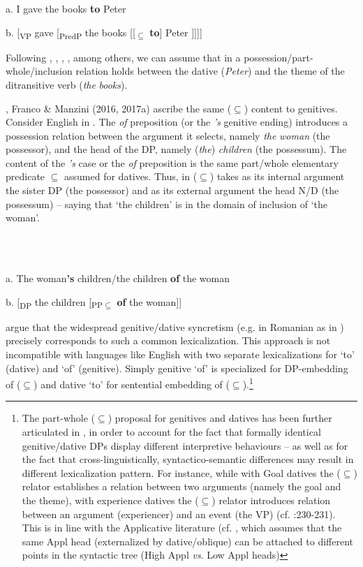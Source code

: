 \documentclass[output=paper]{langsci/langscibook}
\begin{document}
           a.  I gave the books \textbf{to} Peter

b.   [\textsubscript{VP} gave [\textsubscript{PredP} the books [[\textsubscript{${\subseteq}$} \textbf{to}] Peter ]]]]

Following \citet{Kayne1984}, \citet{Pesetsky1995}, \citet{BeckJohnson2004}, \citet{Harley2002}, among others, we can assume that in  a possession/part-whole/inclusion relation holds between the dative (\textit{Peter}) and the theme of the ditransitive verb (\textit{the} \textit{books}). 

\citet{ManziniSavoia2011}, Franco \& Manzini (2016, 2017a) ascribe the same (${\subseteq}$) content to genitives. Consider English in . The \textit{of} preposition (or the \textit{’s} genitive ending) introduces a possession relation between the argument it selects, namely \textit{the} \textit{woman} (the possessor), and the head of the DP, namely (\textit{the}) \textit{children} (the possessum). The content of the \textit{’s} case or the \textit{of} preposition is the same part/whole elementary predicate ${\subseteq}$ assumed for datives. Thus, in  (${\subseteq}$) takes as its internal argument the sister DP (the possessor) and as its external argument the head N/D (the possessum) – saying that ‘the children’ is in the domain of inclusion of ‘the woman’. 

\ea%
    \label{ex:key:2}
    \gll\\
        \\
    \glt
    \z

           a. The woman\textbf{’s} children/the children \textbf{of} the woman 

b. [\textsubscript{DP} the children [\textsubscript{PP${\subseteq}$} \textbf{of} the woman]] 

\citet{ManziniSavoia2011} argue that the widespread genitive/dative syncretism (e.g. in Romanian as in ) precisely corresponds to such a common lexicalization. This approach is not incompatible with languages like English with two separate lexicalizations for ‘to’ (dative) and ‘of’ (genitive). Simply genitive ‘of’ is specialized for DP-embedding of (${\subseteq}$) and dative ‘to’ for sentential embedding of (${\subseteq}$).\footnote{The part-whole (\textrm{${\subseteq}$}) proposal for genitives and datives has been further articulated in \citet{ManziniFranco2016}, \citet{FrancoManzini2017a} in order to account for the fact that formally identical genitive/dative DPs display different interpretive behaviours – as well as for the fact that cross-linguistically, syntactico-semantic differences may result in different lexicalization pattern. For instance, while with Goal datives the (\textrm{${\subseteq}$}) relator establishes a relation between two arguments (namely the goal and the theme), with experience datives the (\textrm{${\subseteq}$}) relator introduces relation between an argument (experiencer) and an event (the VP) (cf. \citealt{ManziniFranco2016}:230-231). This is in line with the Applicative literature (cf. \citep{Pylkkänen2008}, which assumes that the same Appl head (externalized by dative/oblique) can be attached to different points in the syntactic tree (High Appl \textit{vs}. Low Appl heads)} 
\end{document}
